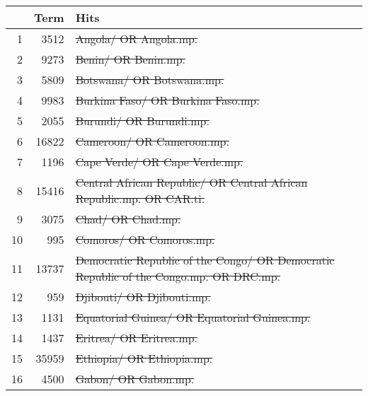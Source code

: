 \searchsize
\begin{tabular}{rrl}
	\toprule
	   &         Term & Hits                                                                                      \\
	\midrule
	 1 &   \num{3512} & \st{Angola/ OR Angola.mp.}                                                                \\
	 2 &   \num{9273} & \st{Benin/ OR Benin.mp.}                                                                  \\
	 3 &   \num{5809} & \st{Botswana/ OR Botswana.mp.}                                                            \\
	 4 &   \num{9983} & \st{Burkina Faso/ OR Burkina Faso.mp.}                                                    \\
	 5 &   \num{2055} & \st{Burundi/ OR Burundi.mp.}                                                              \\
	 6 &  \num{16822} & \st{Cameroon/ OR Cameroon.mp.}                                                            \\
	 7 &   \num{1196} & \st{Cape Verde/ OR Cape Verde.mp.}                                                        \\
	 8 &  \num{15416} & \st{Central African Republic/ OR Central African Republic.mp. OR CAR.ti.}                 \\
	 9 &   \num{3075} & \st{Chad/ OR Chad.mp.}                                                                    \\
	10 &    \num{995} & \st{Comoros/ OR Comoros.mp.}                                                              \\
	11 &  \num{13737} & \st{Democratic Republic of the Congo/ OR Democratic Republic of the Congo.mp. OR DRC.mp.} \\
	12 &    \num{959} & \st{Djibouti/ OR Djibouti.mp.}                                                            \\
	13 &   \num{1131} & \st{Equatorial Guinea/ OR Equatorial Guinea.mp.}                                          \\
	14 &   \num{1437} & \st{Eritrea/ OR Eritrea.mp.}                                                              \\
	15 &  \num{35959} & \st{Ethiopia/ OR Ethiopia.mp.}                                                            \\
	16 &   \num{4500} & \st{Gabon/ OR Gabon.mp.}                                                                  \\

\end{tabular}
